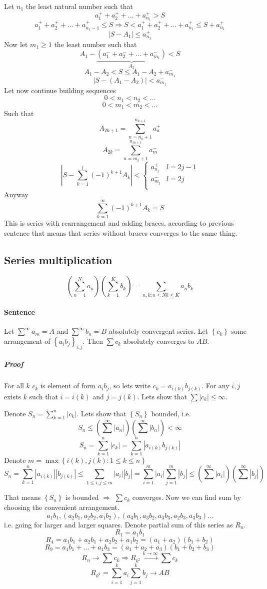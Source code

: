 Let $n_1$ the least natural number such that $$a_1^++a_2^++\dots+a_{n_1}^+ > S$$
$$a_1^++a_2^++\dots+a_{n_1-1}^+ \leq S \Rightarrow S < a_1^++a_2^++\dots+a_{n_1}^+ \leq S+a_{n_1}^+$$
$$\left|S-A_1\right|\leq a_{n_1}^+$$
Now let $m_1\geq 1$ the least number such that $$A_1 - \underbrace{\left(a_1^-+a_2^-+\dots+a_{m_1}^-\right)}_{A_2} < S$$
$$A_1-A_2 < S \leq A_1 - A_2 + a_{m_1}^-$$
$$\left|S-(A_1-A_2)\right|<a_{m_1}^-$$
Let now continue building sequences
$$0<n_1<n_2<\dots$$
$$0<m_1<m_2<\dots$$
Such that 
$$A_{2k+1} = \sum_{n=n_k+1}^{n_{k+1}} a_n^+$$
$$A_{2k} = \sum_{n=m_k+1}^{n_{m+1}} a_m^-$$
$$\left|S - \sum_{k=1}^{l} \left(-1\right)^{k+1} A_k\right| <\begin{cases}
a^+_{n_j} & l=2j-1\\a^-_{m_j} & l=2j\\
\end{cases}$$
Anyway
$$\sum_{k=1}^\infty (-1)^{k+1} A_k = S$$
This is series with rearrangement and adding braces, according to previous sentence that means that series without braces converges to the same thing.
\subsection{Series multiplication}
$$\left(\sum_{n=1}^N a_n\right)\left(\sum_{k=1}^K b_k\right) = \sum_{n,k: n \leq N k\leq K} a_nb_k$$
\paragraph{Sentence}
Let $\sum^{\infty} a_m = A$ and $\sum^\infty b_n = B$ absolutely convergent series. Let $\left\{c_k\right\}$ some arrangement of  $\left\{a_ib_j\right\}_{i,j}$. Then $\sum c_k$ absolutely converges to $AB$.
\subparagraph{Proof}
For all $k$ $c_k$ is element of form $a_ib_j$, so lets write $c_k = a_{i(k)}b_{j(k)}$. For any $i,j$ exists $k$ such that $i=i(k)$ and  $j= j(k)$. 
Lets show that $\sum |c_k| \leq \infty$.

Denote $S_n = \sum_{k=1}^n |c_k|$. Lets show that $\left\{S_n\right\}$ bounded, i.e.
$$S_n \leq \left(\sum^\infty |a_n|\right)\left(\sum^\infty |b_n|\right) < \infty$$
$$S_n = \sum_{k=1}^n |c_k| = \sum_{k=1}^n \left|a_{i(k)}b_{j(k)}\right|$$
Denote $m = \max \left\{ i(k), j(k): 1\leq k\leq n \right\}$
$$S_n = \sum_{k=1}^n |a_{i(k)}||b_{j(k)}| \leq \sum_{1\leq i,j \leq m} |a_i||b_j| = \sum_{i=1}^m |a_i| \sum_{j=1}^m |b_j| \leq \left(\sum^\infty |a_i| \right)\left(\sum^\infty |b_j| \right)$$

That means $\left\{ S_n\right\}$ is bounded $\Rightarrow$ $\sum c_k$ converges. Now we can find sum by choosing the convenient arrangement.
$$a_1b_1, \left(a_2b_1, a_2b_2, a_1b_2\right), \left(a_3b_1, a_3b_2, a_3b_3, a_2b_3, a_3b_3\right) \dots$$
i.e. going for larger and larger squares. Denote partial sum of this series as $R_n$.
$$R_1 = a_1b_1$$
$$R_4 = a_1b_1+a_2b_1+a_2b_2+a_1b_2= (a_1+a_2)(b_1+b_2)$$
$$R_9 = a_1b_1 + \dots + a_1b_3 = (a_1+a_2+a_3)(b_1+b_2+b_3)$$
$$R_n \to \sum c_k \Rightarrow  R_{k^2} \stackrel{k \to \infty}{\to} \sum c_k$$
$$R_{k^2} = \sum_{i=1}^k a_i \sum_{j=1}^k b_j \to AB$$
